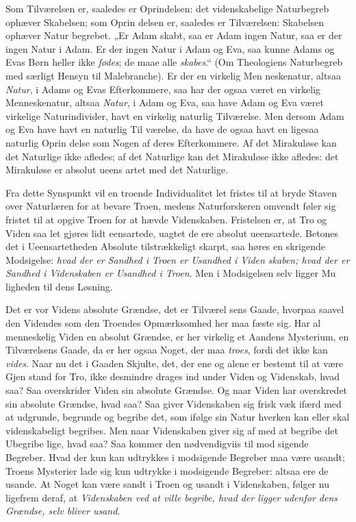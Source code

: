 \documentclass[12pt]{book}
\newcommand{\opage}[1]{\marginnote{\footnotesize\textit{[#1]}}}
\begin{document}
Som Tilværelsen er, saaledes er Oprindelsen: det
videnskabelige Naturbegreb ophæver Skabelsen; som Oprin\-%
delsen er, saaledes er Tilværelsen: Skabelsen ophæver Natur\-%
begrebet. „Er Adam skabt, saa er Adam ingen Natur, saa
er der ingen Natur i Adam. Er der ingen Natur i Adam
og Eva, saa kunne Adams og Evas Børn heller ikke \emph{fødes};
de maae alle \emph{skabes}.“ (Om Theologiens Naturbegreb med
særligt Hensyn til Malebranche). Er der en virkelig Men\-%
neskenatur, altsaa \emph{Natur}, i Adams og Evas Efterkommere,
saa har der ogsaa været en virkelig Menneskenatur, altsaa
\emph{Natur}, i Adam og Eva, saa have Adam og Eva været
virkelige Naturindivider, havt en virkelig naturlig Tilværelse.
Men dersom Adam og Eva have havt en naturlig Til\-%
værelse, da have de ogsaa havt en ligesaa naturlig Oprin\-%
delse som Nogen af deres Efterkommere. Af det Mirakuløse
kan det Naturlige ikke afledes; af det Naturlige kan det
Mirakuløse ikke afledes: det Mirakuløse er absolut ueens\-%
artet med det Naturlige.

Fra dette Synspunkt vil en troende Individualitet let
fristes til at bryde Staven over Naturlæren for at bevare
Troen, medens Naturforskeren omvendt føler sig fristet til
at opgive Troen for at hævde Videnskaben. Fristelsen er, at
Tro og Viden saa let gjøres lidt eensartede, uagtet de ere
absolut ueensartede. Betones det i Ueensartetheden Absolute
tilstrækkeligt skarpt, saa høres en skrigende Modsigelse: \emph{hvad
der er Sandhed i Troen er Usandhed i Viden\-%
skaben; hvad der er Sandhed i Videnskaben er
Usandhed i Troen}. Men i Modsigelsen selv ligger Mu\-%
ligheden til dens Løsning.

Det er vor Videns absolute Grændse, det er Tilværel\-%
\opage{32}\setcounter{footnote}{0}%
sens Gaade, hvorpaa saavel den Videndes som den Troendes
Opmærksomhed her maa fæste sig. Har al menneskelig Viden
en absolut Grændse, er her virkelig et Aandens Mysterium,
en Tilværelsens Gaade, da er her ogsaa Noget, der maa
\emph{troes}, fordi det ikke kan \emph{vides}. Naar nu det i Gaaden
Skjulte, det, der ene og alene er bestemt til at være Gjen\-%
stand for Tro, ikke desmindre drages ind under Viden og
Videnskab, hvad saa? Saa overskrider Viden sin absolute
Grændse. Og naar Viden har overskredet sin absolute
Grændse, hvad saa? Saa giver Videnskaben sig frisk væk
ifærd med at udgrunde, begrunde og begribe det, som ifølge
sin Natur hverken kan eller skal videnskabeligt begribes. Men
naar Videnskaben giver sig af med at begribe det Ubegribe\-%
lige, hvad saa? Saa kommer den nødvendigviis til mod\-%
sigende Begreber. Hvad der kun kan udtrykkes i modsigende
Begreber maa være usandt; Troens Mysterier lade sig kun
udtrykke i modsigende Begreber: altsaa ere de usande. At
Noget kan være sandt i Troen og usandt i Videnskaben,
følger nu ligefrem deraf, at \emph{Videnskaben ved at ville
begribe, hvad der ligger udenfor dens Grændse,
selv bliver usand}.
\end{document}
